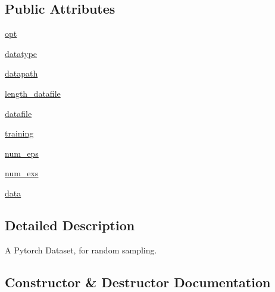 \subsection*{Public Attributes}
\begin{DoxyCompactItemize}
\item 
\hyperlink{classparlai_1_1core_1_1pytorch__data__teacher_1_1ParlAIDataset_a5bf9f1b261c64e4ab37120ba6ed8b935}{opt}
\item 
\hyperlink{classparlai_1_1core_1_1pytorch__data__teacher_1_1ParlAIDataset_a05192273eccb2399271159c081f8a4fa}{datatype}
\item 
\hyperlink{classparlai_1_1core_1_1pytorch__data__teacher_1_1ParlAIDataset_a64e2f65a3ef4b138f1de4780839d545a}{datapath}
\item 
\hyperlink{classparlai_1_1core_1_1pytorch__data__teacher_1_1ParlAIDataset_aa733f49329cc8c3a586eb61b157e7377}{length\+\_\+datafile}
\item 
\hyperlink{classparlai_1_1core_1_1pytorch__data__teacher_1_1ParlAIDataset_acca9d3d351fc78077bfa4fe9acd49212}{datafile}
\item 
\hyperlink{classparlai_1_1core_1_1pytorch__data__teacher_1_1ParlAIDataset_a37ac7bc953e6c36a284c6031af796bfa}{training}
\item 
\hyperlink{classparlai_1_1core_1_1pytorch__data__teacher_1_1ParlAIDataset_a4cdb36350cb9d6ea76b2c8eeb4bb1aaf}{num\+\_\+eps}
\item 
\hyperlink{classparlai_1_1core_1_1pytorch__data__teacher_1_1ParlAIDataset_abdd1801c6e081df8cdb22fcb207edb80}{num\+\_\+exs}
\item 
\hyperlink{classparlai_1_1core_1_1pytorch__data__teacher_1_1ParlAIDataset_a0306ea2e7c88845945b1712391f45297}{data}
\end{DoxyCompactItemize}


\subsection{Detailed Description}
\begin{DoxyVerb}A Pytorch Dataset, for random sampling.
\end{DoxyVerb}
 

\subsection{Constructor \& Destructor Documentation}
\mbox{\label{classparlai_1_1core_1_1pytorch__data__teacher_1_1ParlAIDataset_ac37c4338b73b65fd101bc926e8692366}} 
